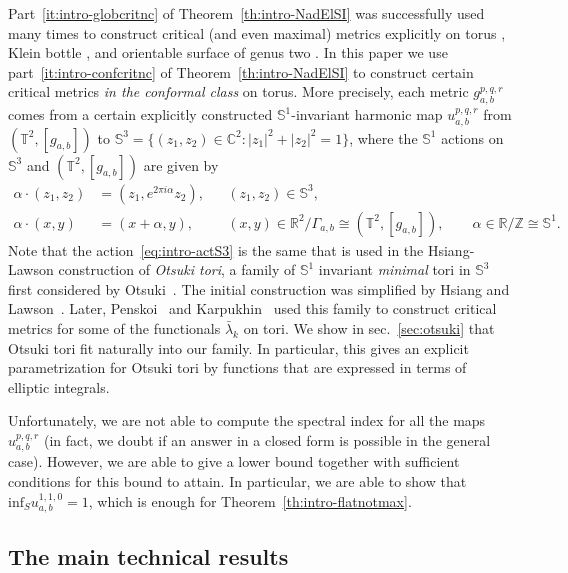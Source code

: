 \documentclass{amsart}
\theoremstyle{plain}
\theoremstyle{definition}
\theoremstyle{remark}
\begin{document}
Part~\ref{it:intro-globcritnc} of Theorem~\ref{th:intro-NadElSI} was
successfully used many times to construct critical (and even maximal) metrics
explicitly on torus \cite{Nad1996,Lap2008,Pen2012,Pen2013b,Pen2015,Kar2014},
Klein bottle \cite{Lap2008,Pen2012,JNP2006,ElSGJ2006,CKM2019}, and orientable
surface of genus two \cite{JLNNP2005,NS2019}. In this paper we use
part~\ref{it:intro-confcritnc} of Theorem~\ref{th:intro-NadElSI} to construct
certain critical metrics \emph{in the conformal class} on torus. More precisely,
each metric \(g_{a,b}^{p,q,r}\) comes from a certain explicitly constructed
\(\mathbb S^1\)-invariant harmonic map \(u_{a,b}^{p,q,r}\) from \((\mathbb
T^2,[g_{a,b}])\) to \(\mathbb S^3=\{(z_1,z_2)\in\mathbb C^2\colon
|z_1|^2+|z_2|^2=1\}\), where the \(\mathbb S^1\) actions on \(\mathbb S^3\) and
\((\mathbb T^2,[g_{a,b}])\) are given by
\begin{align}
\alpha\cdot (z_1,z_2)&=(z_1,e^{2\pi i\alpha}z_2),&&(z_1,z_2)\in\mathbb
S^3,\label{eq:intro-actS3}\\
\alpha\cdot (x,y)&=(x+\alpha,y),&&
(x,y)\in\mathbb R^2/\Gamma_{a,b}\cong (\mathbb T^2,[g_{a,b}]),\qquad
\alpha\in\mathbb R/\mathbb Z\cong\mathbb S^1.
\label{eq:intro-actT2}
\end{align}
Note that the action~\eqref{eq:intro-actS3} is the same that is used in the
Hsiang-Lawson construction of \emph{Otsuki tori}, a family of \(\mathbb S^1\)
invariant \emph{minimal} tori in \(\mathbb S^3\) first considered by
Otsuki~\cite{Ots1970}. The initial construction was simplified by Hsiang and
Lawson~\cite{HL1971}. Later, Penskoi~\cite{Pen2013b} and
Karpukhin~\cite{Kar2014} used this family to construct critical metrics for some
of the functionals \(\bar\lambda_k\) on tori. We show in sec.~\ref{sec:otsuki}
that Otsuki tori fit naturally into our family. In particular, this gives an
explicit parametrization for Otsuki tori by functions that are expressed in
terms of elliptic integrals.

Unfortunately, we are not able to compute the spectral index for all the maps
\(u_{a,b}^{p,q,r}\) (in fact, we doubt if an answer in a closed form is possible
in the general case). However, we are able to give a lower bound together with
sufficient conditions for this bound to attain. In particular, we are able to
show that \(\mathrm{inf}_S u_{a,b}^{1,1,0}=1\), which is enough for
Theorem~\ref{th:intro-flatnotmax}.

\subsection{The main technical results}
\end{document}

